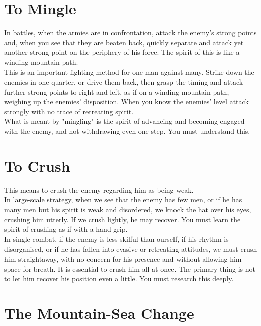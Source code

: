 \section{To Mingle}

In battles, when the armies are in confrontation, attack the enemy's strong points and, when you see that they are beaten back, quickly separate and attack yet another strong point on the periphery of his force. The spirit of this is like a winding mountain path.\\

This is an important fighting method for one man against many. Strike down the enemies in one quarter, or drive them back, then grasp the timing and attack further strong points to right and left, as if on a winding mountain path, weighing up the enemies' disposition. When you know the enemies' level attack strongly with no trace of retreating spirit.\\

What is meant by "mingling" is the spirit of advancing and becoming engaged with the enemy, and not withdrawing even one step. You must understand this.\\
\section{To Crush}

This means to crush the enemy regarding him as being weak.\\

In large-scale strategy, when we see that the enemy has few men, or if he has many men but his spirit is weak and disordered, we knock the hat over his eyes, crushing him utterly. If we crush lightly, he may recover. You must learn the spirit of crushing as if with a hand-grip.\\

In single combat, if the enemy is less skilful than ourself, if his rhythm is disorganised, or if he has fallen into evasive or retreating attitudes, we must crush him straightaway, with no concern for his presence and without allowing him space for breath. It is essential to crush him all at once. The primary thing is not to let him recover his position even a little. You must research this deeply.\\
\section{The Mountain-Sea Change}

